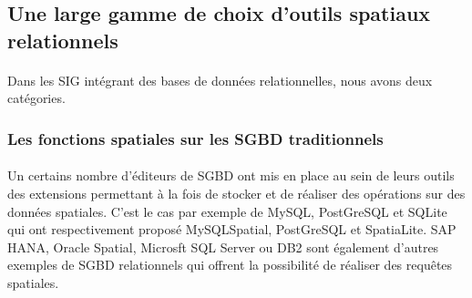 
\subsection{Une large gamme de choix d'outils spatiaux relationnels}

\paragraph{}Dans les SIG intégrant des bases de données relationnelles, nous avons deux catégories.

\subsubsection{Les fonctions spatiales sur les SGBD traditionnels}
\paragraph{}Un certains nombre d'éditeurs de \acrlong{SGBD} ont mis en place au sein de leurs outils des extensions permettant à la fois de stocker et de réaliser des opérations sur des données spatiales. C'est le cas par exemple de MySQL, PostGreSQL et SQLite qui ont respectivement proposé MySQLSpatial, PostGreSQL et SpatiaLite. SAP HANA, Oracle Spatial, Microsft SQL Server ou DB2 sont également d'autres exemples de \acrshort{SGBD} relationnels qui offrent la possibilité de réaliser des requêtes spatiales.


